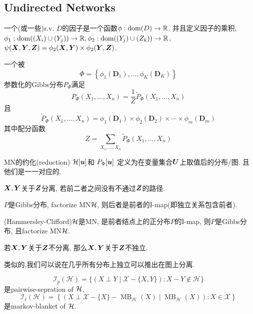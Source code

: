 \documentclass{article}
\begin{document}
\subsection{Undirected Networks}

\begin{flushleft}
     一个(或一些)r.v. $D$的因子是一个函数$\phi: \operatorname{dom}(D)\to \R$. 并且定义因子的乘积, $\phi_1: \operatorname{dom}((X_i)\cup (Y_j))\to \R, \phi_2: \operatorname{dom}((Y_j)\cup (Z_k))\to \R$, $\psi(\bs X, \bs Y, \bs Z) = \phi_2(\bs X, \bs Y)\times \phi_2(\bs Y, \bs Z)$.

     一个被$$\Phi=\left\{\phi_{1}\left(\boldsymbol{D}_{1}\right), \ldots, \phi_{K}\left(\boldsymbol{D}_{K}\right)\right\}$$参数化的Gibbs分布$P_\Phi$满足
    \begin{equation}
        P_{\Phi}\left(X_{1}, \ldots, X_{n}\right)=\frac{1}{Z} \tilde{P}_{\Phi}\left(X_{1}, \ldots, X_{n}\right)
    \end{equation}
    且
    \begin{equation}
        \tilde{P}_{\Phi}\left(X_{1}, \ldots, X_{n}\right)=\phi_{1}\left(\boldsymbol{D}_{1}\right) \times \phi_{2}\left(\boldsymbol{D}_{2}\right) \times \cdots \times \phi_{m}\left(\boldsymbol{D}_{m}\right)
    \end{equation}
    其中配分函数
    \begin{equation}
        Z=\sum_{X_{1}, \ldots, X_{n}} \tilde{P}_{\Phi}\left(X_{1}, \ldots, X_{n}\right)
    \end{equation}

     MN的约化(reduction) $\cal H[\bs u]$和 $P_\Phi[\bs u]$ 定义为在变量集合$\bs U$上取值后的分布/图. 且他们是一一对应的.

     $\bs X, \bs Y$关于$\bs Z$分离, 若前二者之间没有不通过$\bs Z$的路径.

     $P$是Gibbs分布, factorize MN$\cal H$, 则后者是前者的I-map(即独立关系包含前者).

     (Hammersley-Clifford)$\cal H$是MN, 是前者结点上的正分布$P$的I-map, 则$P$是Gibbs分布, 且factorize MN$\cal H$.

     若$\bs X, \bs Y$关于$\bs Z$不分离, 那么$\bs X, \bs Y$关于$\bs Z$不独立.

    类似的,我们可以说在几乎所有分布上独立可以推出在图上分离.
    
     \begin{equation}
        \mathcal{I}_{p}(\mathcal{H})=\{(X \perp Y \mid \mathcal{X}-\{X, Y\}): X-Y \notin \mathcal{H}\}
    \end{equation}是pairwise-sepration of $\cal H$, 
    \begin{equation}
        \mathcal{I}_{\ell}(\mathcal{H})=\left\{\left(X \perp \mathcal{X}-\{X\}-\operatorname{MB}_{\mathcal{H}}(X) \mid \operatorname{MB}_{\mathcal{H}}(X)\right): X \in \mathcal{X}\right\}
    \end{equation}
    是markov-blanket of $\cal H$.


\end{flushleft}
\end{document}
